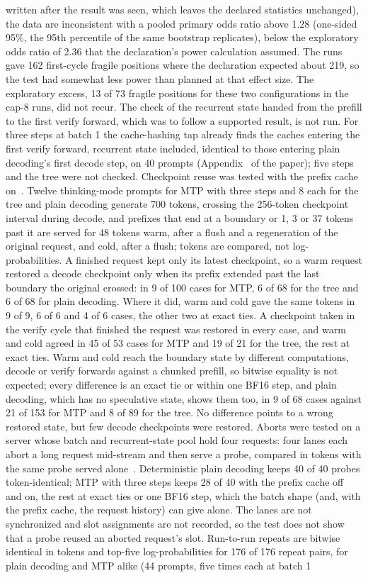 written after the result was seen, which leaves the declared statistics unchanged), the data are inconsistent with a pooled primary odds ratio above 1.28 (one-sided 95\%, the 95th percentile of the same bootstrap replicates), below the exploratory odds ratio of 2.36 that the declaration's power calculation assumed. The runs gave 162 first-cycle fragile positions where the declaration expected about 219, so the test had somewhat less power than planned at that effect size. The exploratory excess, 13 of 73 fragile positions for these two configurations in the cap-8 runs, did not recur. The check of the recurrent state handed from the prefill to the first verify forward, which was to follow a supported result, is not run. For three steps at batch 1 the cache-hashing tap already finds the caches entering the first verify forward, recurrent state included, identical to those entering plain decoding's first decode step, on 40 prompts (Appendix~ of the paper); five steps and the tree were not checked. Checkpoint reuse was tested with the prefix cache on~. Twelve thinking-mode prompts for MTP with three steps and 8 each for the tree and plain decoding generate 700 tokens, crossing the 256-token checkpoint interval during decode, and prefixes that end at a boundary or 1, 3 or 37 tokens past it are served for 48 tokens warm, after a flush and a regeneration of the original request, and cold, after a flush; tokens are compared, not log-probabilities. A finished request kept only its latest checkpoint, so a warm request restored a decode checkpoint only when its prefix extended past the last boundary the original crossed: in 9 of 100 cases for MTP, 6 of 68 for the tree and 6 of 68 for plain decoding. Where it did, warm and cold gave the same tokens in 9 of 9, 6 of 6 and 4 of 6 cases, the other two at exact ties. A checkpoint taken in the verify cycle that finished the request was restored in every case, and warm and cold agreed in 45 of 53 cases for MTP and 19 of 21 for the tree, the rest at exact ties. Warm and cold reach the boundary state by different computations, decode or verify forwards against a chunked prefill, so bitwise equality is not expected; every difference is an exact tie or within one BF16 step, and plain decoding, which has no speculative state, shows them too, in 9 of 68 cases against 21 of 153 for MTP and 8 of 89 for the tree. No difference points to a wrong restored state, but few decode checkpoints were restored. Aborts were tested on a server whose batch and recurrent-state pool hold four requests: four lanes each abort a long request mid-stream and then serve a probe, compared in tokens with the same probe served alone~. Deterministic plain decoding keeps 40 of 40 probes token-identical; MTP with three steps keeps 28 of 40 with the prefix cache off and on, the rest at exact ties or one BF16 step, which the batch shape (and, with the prefix cache, the request history) can give alone. The lanes are not synchronized and slot assignments are not recorded, so the test does not show that a probe reused an aborted request's slot. Run-to-run repeats are bitwise identical in tokens and top-five log-probabilities for 176 of 176 repeat pairs, for plain decoding and MTP alike (44 prompts, five times each at batch 1 